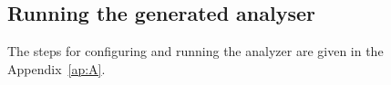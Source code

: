 \documentclass[11pt,a4paper,openright]{report}
\begin{document}
\subsection{Running the generated analyser}
The steps for configuring and running the analyzer are given in the Appendix~\ref{ap:A}.

\end{document}
